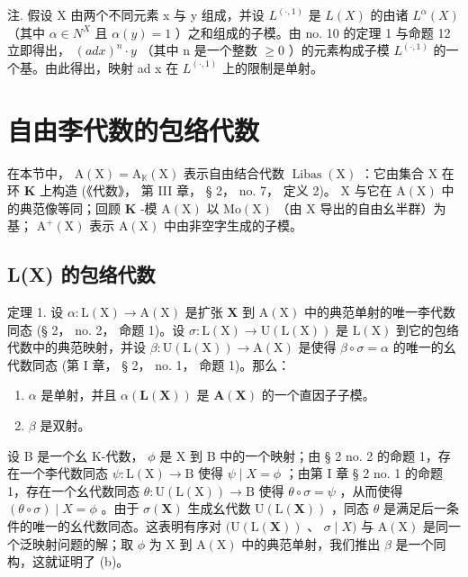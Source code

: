 注. 假设 X 由两个不同元素 x 与 y 组成，并设 \(L^{(\cdot,1)}\) 是 \(L(X)\) 的由诸 \(L^{\alpha}(X)\) （其中 \(\alpha\in N^{X}\) 且 \(\alpha(y)=1\) ）之和组成的子模。由 no. 10 的定理 1 与命题 12 立即得出， \((ad x)^{n}\cdot y\) （其中 n 是一个整数 \(\geqslant0\) ）的元素构成子模 \(L^{(\cdot,1)}\) 的一个基。由此得出，映射 ad x 在 \(L^{(\cdot,1)}\) 上的限制是单射。

\section{自由李代数的包络代数}

在本节中， \(\mathrm{A}(\mathrm{X}) = \mathrm{A}_{\mathbb{K}}(\mathrm{X})\) 表示自由结合代数 \(\operatorname{Libas}(\mathrm{X})\) ：它由集合 \(\mathrm{X}\) 在环 \(\mathbf{K}\) 上构造 (《代数》， 第 III 章， § 2， no. 7， 定义 2)。 \(\mathrm{X}\) 与它在 \(\mathrm{A}(\mathrm{X})\) 中的典范像等同；回顾 \(\mathbf{K}\) -模 \(\mathrm{A}(\mathrm{X})\) 以 \(\mathrm{Mo}(\mathrm{X})\) （由 \(\mathrm{X}\) 导出的自由幺半群）为基； \(\mathrm{A}^{+}(\mathrm{X})\) 表示 \(\mathrm{A}(\mathrm{X})\) 中由非空字生成的子模。

\subsection{L(X) 的包络代数}

定理 1. 设 \(\alpha: \mathrm{L}(\mathrm{X}) \to \mathrm{A}(\mathrm{X})\) 是扩张 \(\mathbf{X}\) 到 \(\mathrm{A}(\mathrm{X})\) 中的典范单射的唯一李代数同态 (§ 2， no. 2， 命题 1)。设 \(\sigma \colon \mathrm{L}(\mathrm{X}) \to \mathrm{U}(\mathrm{L}(\mathrm{X}))\) 是 \(\mathrm{L}(\mathrm{X})\) 到它的包络代数中的典范映射，并设 \(\beta \colon \mathrm{U}(\mathrm{L}(\mathrm{X})) \to \mathrm{A}(\mathrm{X})\) 是使得 \(\beta \circ \sigma = \alpha\) 的唯一的幺代数同态 (第 I 章， § 2， no. 1， 命题 1)。那么：

\begin{enumerate}
\def\labelenumi{(\alph{enumi})}
\item
  \(\alpha\) 是单射，并且 \(\alpha(\mathbf{L}(\mathbf{X}))\) 是 \(\mathbf{A}(\mathbf{X})\) 的一个直因子子模。
\item
  \(\beta\) 是双射。
\end{enumerate}

设 B 是一个幺 K-代数， \(\phi\) 是 X 到 B 中的一个映射；由 § 2 no. 2 的命题 1，存在一个李代数同态 \(\psi\colon\mathrm{L}(\mathrm{X})\to\mathrm{B}\) 使得 \(\psi\mid X=\phi\) ；由第 I 章 § 2 no. 1 的命题 1，存在一个幺代数同态 \(\theta\colon\mathrm{U}(\mathrm{L}(\mathrm{X}))\to\mathrm{B}\) 使得 \(\theta\circ\sigma=\psi\) ，从而使得 \((\theta\circ\sigma)\mid X=\phi\) 。由于 \(\sigma(\mathbf{X})\) 生成幺代数 \(\mathrm{U}(\mathrm{L}(\mathbf{X}))\) ，同态 \(\theta\) 是满足后一条件的唯一的幺代数同态。这表明有序对 \((\mathrm{U}(\mathrm{L}(\mathbf{X}))\) 、 \(\sigma\mid X)\) 与 \(\mathrm{A}(\mathrm{X})\) 是同一个泛映射问题的解；取 \(\phi\) 为 X 到 \(\mathrm{A}(\mathrm{X})\) 中的典范单射，我们推出 \(\beta\) 是一个同构，这就证明了 (b)。

